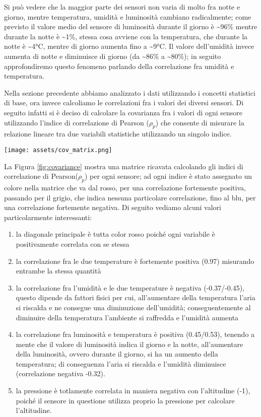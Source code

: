 \documentclass[fleqn, 10pt]{SelfArx}
\begin{document}
Si può vedere che la maggior parte dei sensori non varia di molto fra notte e giorno, mentre temperatura, umidità e luminosità cambiano radicalmente; come previsto il valore medio 
del sensore di luminosità durante il giorno è \textasciitilde96\% mentre durante la notte è \textasciitilde1\%, stessa cosa avviene con la temperatura, che durante la notte è \textasciitilde4°C, mentre di 
giorno aumenta fino a \textasciitilde9°C. Il valore dell'umidità invece aumenta di notte e diminuisce di giorno (da \textasciitilde86\% a \textasciitilde80\%); in seguito approfondiremo questo fenomeno parlando 
della correlazione fra umidità e temperatura.

Nella sezione precedente abbiamo analizzato i dati utilizzando i concetti statistici di base, ora invece calcoliamo le correlazioni fra i valori dei diversi sensori. Di seguito infatti si è deciso di calcolare 
la covarianza fra i valori di ogni sensore utilizzando l'indice di correlazione di Pearson ($\rho_p$)\cite{pearson} che consente di misurare la relazione lineare tra due variabili statistiche utilizzando un singolo indice.

\begin{figure*}[htb]
\centering
\texttt{[image: assets/cov\_matrix.png]}
\caption{Matrice degli indici di correlazione di Pearson($\rho_p$)}
\label{fig:covariance}
\end{figure*}

La Figura \ref{fig:covariance} mostra una matrice ricavata calcolando gli indici di correlazione di Pearson($\rho_p$) per ogni sensore; ad ogni indice è stato assegnato un colore nella matrice
che va dal rosso, per una correlazione fortemente positiva, passando per il grigio, che indica nessuna particolare correlazione, fino al blu, per una correlazione fortemente negativa. Di seguito vediamo
alcuni valori particolarmente interessanti:

\begin{enumerate}
  \item la diagonale principale è tutta color rosso poiché ogni variabile è positivamente correlata con se stessa
  \item la correlazione fra le due temperature è fortemente positiva (0.97) misurando entrambe la stessa quantità
  \item la correlazione fra l'umidità e le due temperature è negativa (-0.37/-0.45), questo dipende da fattori fisici per cui, all'aumentare della temperatura l'aria si riscalda e ne consegue una diminuzione dell'umidità; 
  conseguentemente al diminuire della temperatura l'ambiente si raffredda e l'umidità aumenta
  \item la correlazione fra luminosità e temperatura è positiva (0.45/0.53), tenendo a mente che il valore di luminosità indica il giorno e la notte, all'aumentare della luminosità, ovvero durante il giorno, si ha un aumento
  della temperatura; di conseguenza l'aria si riscalda e l'umidità diminuisce (correlazione negativa -0.32). 
  \item la pressione è totlamente correlata in maniera negativa con l'altitudine (-1), poiché il sensore in questione utilizza proprio la pressione per calcolare l'altitudine.
\end{enumerate}
\end{document}
